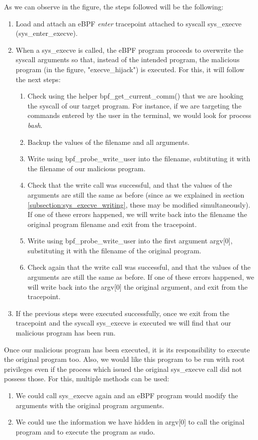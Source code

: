 As we can observe in the figure, the steps followed will be the following:
\begin{enumerate}
\item Load and attach an eBPF \textit{enter} tracepoint attached to syscall sys\_execve (sys\_enter\_execve). 
\item When a sys\_execve is called, the eBPF program proceeds to overwrite the syscall arguments so that, instead of the intended program, the malicious program (in the figure, "execve\_hijack") is executed. For this, it will follow the next steps:

\begin{enumerate}
	\item Check using the helper bpf\_get\_current\_comm() that we are hooking the syscall of our target program. For instance, if we are targeting the commands entered by the user in the terminal, we would look for process \textit{bash}.
	\item Backup the values of the filename and all arguments.
	\item Write using bpf\_probe\_write\_user into the filename, subtituting it with the filename of our malicious program.
	\item Check that the write call was successful, and that the values of the arguments are still the same as before (since as we explained in section \ref{subsection:sys_execve_writing}, these may be modified simultaneously). If one of these errors happened, we will write back into the filename the original program filename and exit from the tracepoint.
	\item Write using bpf\_probe\_write\_user into the first argument argv[0], substituting it with the filename of the original program.
	\item Check again that the write call was successful, and that the values of the arguments are still the same as before. If one of these errors happened, we will write back into the argv[0] the original argument, and exit from the tracepoint.
\end{enumerate}
\item If the previous steps were executed successfully, once we exit from the tracepoint and the syscall sys\_execve is executed we will find that our malicious program has been run.
\end{enumerate}

Once our malicious program has been executed, it is its responsibility to execute the original program too. Also, we would like this program to be run with root privileges even if the process which issued the original sys\_execve call did not possess those. For this, multiple methods can be used:
\begin{enumerate}
\item We could call sys\_execve again and an eBPF program would modify the arguments with the original program arguments.
\item We could use the information we have hidden in argv[0] to call the original program and to execute the program as sudo.
\end{enumerate}

